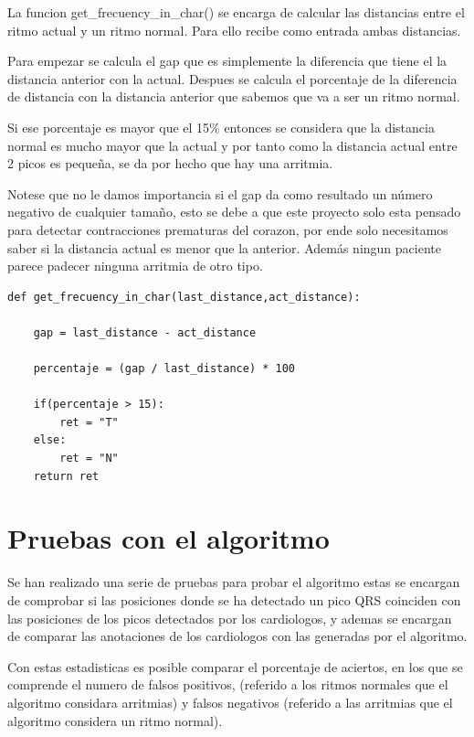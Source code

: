 La funcion get\_frecuency\_in\_char() se encarga de calcular las distancias entre el ritmo actual y un ritmo normal. 
Para ello recibe como entrada ambas distancias.

Para empezar se calcula el gap que es simplemente la diferencia que tiene el la distancia anterior con la actual.
Despues se calcula el porcentaje de la diferencia de distancia con la distancia anterior que sabemos que va a ser 
un ritmo normal.

Si ese porcentaje es mayor que el 15\% entonces se considera que la distancia normal es mucho mayor que la actual
y por tanto como la distancia actual entre 2 picos es pequeña, se da por hecho que hay una arritmia.

Notese que no le damos importancia si el gap da como resultado un número negativo de cualquier tamaño, esto se debe
a que este proyecto solo esta pensado para detectar contracciones prematuras del corazon, por ende solo necesitamos 
saber si la distancia actual es menor que la anterior. Además ningun paciente parece padecer ninguna arritmia de otro
tipo.

\lstset{language=python, breaklines=true, basicstyle=\footnotesize}
\begin{lstlisting}[frame=single]
def get_frecuency_in_char(last_distance,act_distance): 

    gap = last_distance - act_distance

    percentaje = (gap / last_distance) * 100

    if(percentaje > 15):
        ret = "T"
    else:
        ret = "N"
    return ret

\end{lstlisting}

\section{Pruebas con el algoritmo}

Se han realizado una serie de pruebas para probar el algoritmo estas se encargan de comprobar si las posiciones donde
se ha detectado un pico QRS coinciden con las posiciones de los picos detectados por los cardiologos, y ademas se 
encargan de comparar las anotaciones de los cardiologos con las generadas por el algoritmo.

Con estas estadisticas es posible comparar el porcentaje de aciertos, en los que se comprende el numero de 
falsos positivos, (referido a los ritmos normales que el algoritmo considara arritmias) y 
falsos negativos (referido a las arritmias que el algoritmo considera un ritmo normal).

